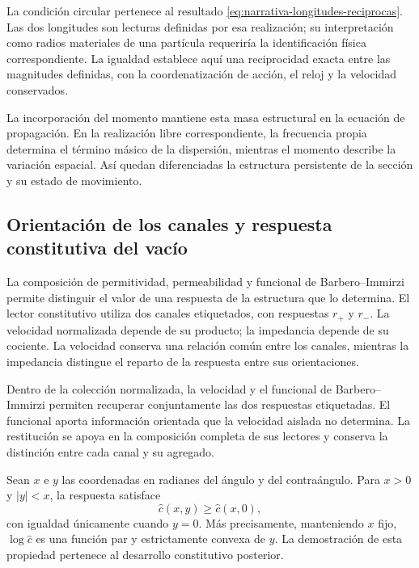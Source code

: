 La condición circular pertenece al resultado
\eqref{eq:narrativa-longitudes-reciprocas}. Las dos longitudes son lecturas
definidas por esa realización; su interpretación como radios materiales de
una partícula requeriría la identificación física correspondiente. La
igualdad establece aquí una reciprocidad exacta entre las magnitudes
definidas, con la coordenatización de acción, el reloj y la velocidad conservados.

La incorporación del momento mantiene esta masa estructural en la ecuación
de propagación. En la realización libre correspondiente, la frecuencia
propia determina el término másico de la dispersión, mientras el momento
describe la variación espacial. Así quedan diferenciadas la estructura
persistente de la sección y su estado de movimiento.

\subsection{Orientación de los canales y respuesta constitutiva del vacío}
\label{subsec:narrativa-vacio-orientacion}

La composición de permitividad, permeabilidad y funcional de Barbero--Immirzi
permite distinguir el valor de una respuesta de la estructura que lo
determina. El lector constitutivo utiliza dos canales etiquetados, con
respuestas $r_+$ y $r_-$. La velocidad normalizada depende de su producto;
la impedancia depende de su cociente. La velocidad conserva una relación
común entre los canales, mientras la impedancia distingue el reparto de la
respuesta entre sus orientaciones.

Dentro de la colección normalizada, la velocidad y el funcional de
Barbero--Immirzi permiten recuperar conjuntamente las dos respuestas
etiquetadas. El funcional aporta información orientada que la velocidad
aislada no determina. La restitución se apoya en la composición completa
de sus lectores y conserva la distinción entre cada canal y su agregado.

Sean $x$ e $y$ las coordenadas en radianes del ángulo y del contraángulo.
Para $x>0$ y $|y|<x$, la respuesta satisface
\begin{equation}
 \widehat c(x,y)\geq\widehat c(x,0),
 \label{eq:narrativa-convexidad-velocidad}
\end{equation}
con igualdad únicamente cuando $y=0$. Más precisamente, manteniendo $x$
fijo, $\log\widehat c$ es una función par y estrictamente convexa de $y$.
La demostración de esta propiedad pertenece al desarrollo constitutivo
posterior.

